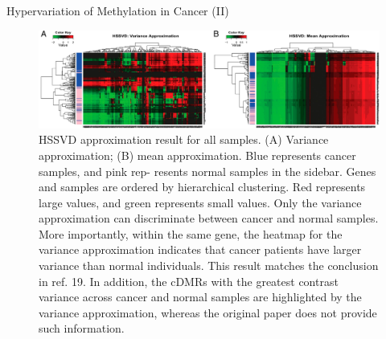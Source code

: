 \documentclass{beamer}
\begin{document}
\begin{frame}{Hypervariation of Methylation in Cancer (II)}
  \begin{figure}
    \includegraphics[width=\linewidth]{figures/fig3.png}
    \caption{HSSVD approximation result for all samples. (A) Variance
      approximation; (B) mean approximation. Blue represents cancer samples,
      and pink rep- resents normal samples in the sidebar. Genes and samples
      are ordered by hierarchical clustering. Red represents large values, and
      green represents small values. Only the variance approximation can
      discriminate between cancer and normal samples. More importantly, within
      the same gene, the heatmap for the variance approximation indicates that
      cancer patients have larger variance than normal individuals. This result
      matches the conclusion in ref. 19. In addition, the cDMRs with the
      greatest contrast variance across cancer and normal samples are
      highlighted by the variance approximation, whereas the original paper
      does not provide such information.}
  \end{figure}
\end{frame}
\end{document}
